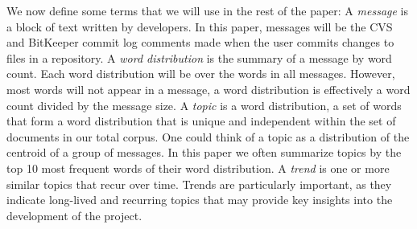 \documentclass[times, 10pt,twocolumn]{article}
\newcommand{\shrinkit}{\vspace*{-.3em}}
\begin{document}
\shrinkit
{}
\shrinkit


We now define some terms that we will use in the rest of the paper: A
\emph{message} is a block of text written by developers. In this
paper, messages will be the CVS and BitKeeper commit log comments made
when the user commits changes to files in a repository. A \emph{word
  distribution} is the summary of a message by word count. Each word
distribution will be over the words in all messages. However, most
words will not appear in a message, a word distribution is effectively
a word count divided by the message size. A \emph{topic} is a word
distribution, a set of words that form a word distribution that is
unique and independent within the set of documents in our total
corpus. One could think of a topic as a distribution of the centroid
of a group of messages. In this paper we often summarize topics by the
top 10 most frequent words of their word distribution.  A \emph{trend}
is one or more similar topics that recur over time.  Trends are
particularly important, as they indicate long-lived and recurring
topics that may provide key insights into the development of the
project.
\end{document}
